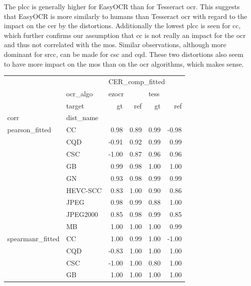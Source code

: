 The \gls{plcc} is generally higher for EasyOCR than for Tesseract \gls{ocr}.
This suggests that EasyOCR is more similarly to humans than Tesseract \gls{ocr} with regard to the impact on the \gls{cer} by the distortions.
Additionally the lowest \gls{plcc} is seen for \gls{cc}, which further confirms our assumption that \gls{cc} is not really an impact for the \gls{ocr} and thus not correlated with the \gls{mos}.
Similar observations, although more dominant for \gls{srcc}, can be made for \gls{csc} and \gls{cqd}.
These two distortions also seem to have more impact on the \gls{mos} than on the \gls{ocr} algorithms, which makes sense.


\begin{table}[h]
\centering
\begin{tabular}{llrrrr}
\toprule
                 & {} & \multicolumn{4}{l}{CER\_comp\_fitted} \\
                 & ocr\_algo & \multicolumn{2}{l}{ezocr} & \multicolumn{2}{l}{tess} \\
                 & target &              gt &   ref &    gt &   ref \\
corr & dist\_name &                 &       &       &       \\
\midrule
pearson\_fitted & CC &            0.98 &  0.89 &  0.99 & -0.98 \\
                 & CQD &           -0.91 &  0.92 &  0.99 &  0.99 \\
                 & CSC &           -1.00 &  0.87 &  0.96 &  0.96 \\
                 & GB &            0.99 &  0.98 &  1.00 &  1.00 \\
                 & GN &            0.93 &  0.98 &  0.99 &  0.99 \\
                 & HEVC-SCC &            0.83 &  1.00 &  0.90 &  0.86 \\
                 & JPEG &            0.98 &  0.99 &  0.88 &  1.00 \\
                 & JPEG2000 &            0.85 &  0.98 &  0.99 &  0.85 \\
                 & MB &            1.00 &  1.00 &  1.00 &  0.99 \\
spearmanr\_fitted & CC &            1.00 &  0.99 &  1.00 & -1.00 \\
                 & CQD &           -0.83 &  1.00 &  1.00 &  1.00 \\
                 & CSC &           -1.00 &  1.00 &  0.80 &  1.00 \\
                 & GB &            1.00 &  1.00 &  1.00 &  1.00 \\

\end{tabular}
\end{table}
